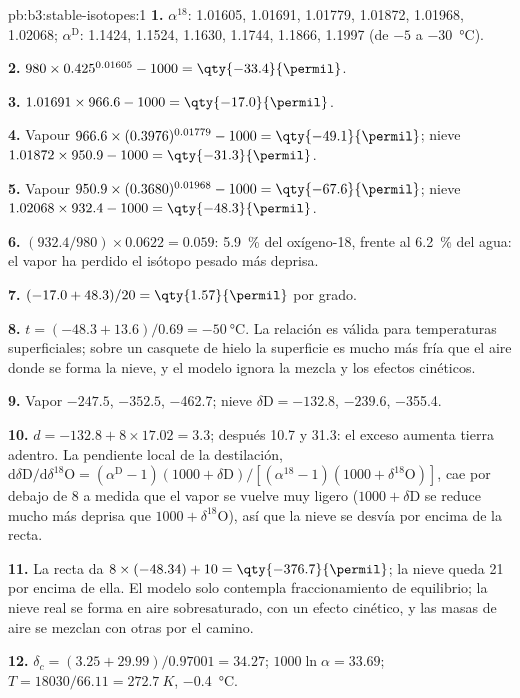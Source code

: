 \begin{solution}{pb:b3:stable-isotopes:1}
\textbf{1.} $\alpha^{18}$: 1.01605, 1.01691, 1.01779, 1.01872, 1.01968,
1.02068; $\alpha^{\mathrm D}$: 1.1424, 1.1524, 1.1630, 1.1744, 1.1866, 1.1997
(de $-5$ a \qty{-30}{\celsius}).

\textbf{2.} $980\times0.425^{0.01605} - 1000 = \qty{-33.4}{\permil}$.

\textbf{3.} $1.01691\times966.6 - 1000 = \qty{-17.0}{\permil}$.

\textbf{4.} Vapour $966.6\times(0.3976)^{0.01779} - 1000 = \qty{-49.1}{\permil}$;
nieve $1.01872\times950.9 - 1000 = \qty{-31.3}{\permil}$.

\textbf{5.} Vapour $950.9\times(0.3680)^{0.01968} - 1000 = \qty{-67.6}{\permil}$;
nieve $1.02068\times932.4 - 1000 = \qty{-48.3}{\permil}$.

\textbf{6.} $(932.4/980)\times0.0622 = 0.059$: \qty{5.9}{\percent} del
oxígeno-18, frente al \qty{6.2}{\percent} del agua: el vapor ha perdido el
isótopo pesado más deprisa.

\textbf{7.} $(-17.0 + 48.3)/20 = \qty{1.57}{\permil}$ por grado.

\textbf{8.} $t = (-48.3 + 13.6)/0.69 = \qty{-50}{\celsius}$. La relación es
válida para temperaturas superficiales; sobre un casquete de hielo la superficie es mucho más fría que el
aire donde se forma la nieve, y el modelo ignora la mezcla y los efectos cinéticos.

\textbf{9.} Vapor $-247.5$, $-352.5$, \qty{-462.7}{\permil}; nieve $\delta\mathrm D
= -132.8$, $-239.6$, \qty{-355.4}{\permil}.

\textbf{10.} $d = -132.8 + 8\times17.02 = 3.3$; después 10.7 y
\qty{31.3}{\permil}: el exceso aumenta tierra adentro. La pendiente local de la
destilación, $\mathrm d\delta\mathrm D/\mathrm d\delta^{18}\mathrm O = (\alpha^{\mathrm D} -
1)(1000 + \delta\mathrm D)/[(\alpha^{18} - 1)(1000 + \delta^{18}\mathrm O)]$, cae por debajo de
8 a medida que el vapor se vuelve muy ligero ($1000 + \delta\mathrm D$ se reduce mucho más deprisa que
$1000 + \delta^{18}\mathrm O$), así que la nieve se desvía por encima de la recta.

\textbf{11.} La recta da $8\times(-48.34) + 10 = \qty{-376.7}{\permil}$; la
nieve queda \qty{21}{\permil} por encima de ella. El modelo solo contempla
fraccionamiento de equilibrio; la nieve real se forma en aire sobresaturado, con un efecto cinético,
y las masas de aire se mezclan con otras por el camino.

\textbf{12.} $\delta_c = (3.25 + 29.99)/0.97001 = 34.27$; $1000\ln\alpha =
33.69$; $T = 18030/66.11 = \qty{272.7}{K}$, \qty{-0.4}{\celsius}.


\end{solution}
